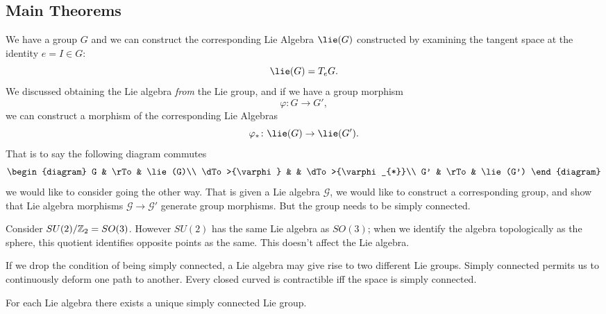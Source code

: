 \subsection{Main Theorems}
We have a group $G$ and we can construct the corresponding Lie
Algebra $\lie(G)$ constructed by examining the tangent space at
the identity $e=I\in G$:
\begin{equation}
\lie(G)=T_{e}G.
\end{equation}
We discussed obtaining the Lie algebra \emph{from} the Lie group,
and if we have a group morphism
\begin{equation}
\varphi\colon G\to G',
\end{equation}
we can construct a morphism of the corresponding Lie Algebras
\begin{equation}
\varphi_{*}\colon \lie(G)\to\lie(G').
\end{equation}
That is to say the following diagram commutes
\begin{equation}
\begin{diagram}
G              & \rTo & \lie(G)\\
\dTo>{\varphi} &      & \dTo>{\varphi_{*}}\\
G'             & \rTo & \lie(G')
\end{diagram}
\end{equation}
we would like to consider going the other way. That is given a
Lie algebra $\mathscr{G}$, we would like to construct a
corresponding group, and show that Lie algebra morphisms
$\mathscr{G}\to\mathscr{G}'$ generate group morphisms. But  the
group needs to be simply connected.

Consider $SU(2)/\Bbb{Z}_{2}=SO(3)$. However $SU(2)$ has the same
Lie algebra as $SO(3)$; when we identify the algebra
topologically as the sphere, this quotient identifies opposite
points as the same. This doesn't affect the Lie algebra.

If we drop the condition of being simply connected, a Lie algebra
may give rise to two different Lie groups. Simply connected
permits us to continuously deform one path to another. Every
closed curved is contractible iff the space is simply connected.

\begin{thm}
For each Lie algebra there exists a unique simply connected Lie group.
\end{thm}

